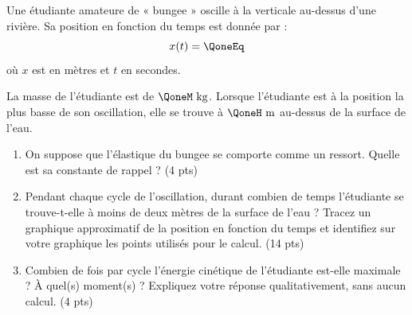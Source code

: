 
Une étudiante amateure de « bungee » oscille à la verticale au-dessus d'une rivière. Sa position en fonction du temps est donnée par :
\[ x(t) = \QoneEq \]
où $x$ est en mètres et $t$ en secondes.

La masse de l'étudiante est de $\QoneM\text{ kg}$. Lorsque l'étudiante est à la position la plus basse de son oscillation, elle se trouve à $\QoneH\text{ m}$ au-dessus de la surface de l'eau.

\begin{enumerate}[label=\alph*)]
    \item On suppose que l'élastique du bungee se comporte comme un ressort. Quelle est sa constante de rappel ? (4 pts)
    \item Pendant chaque cycle de l'oscillation, durant combien de temps l'étudiante se trouve-t-elle à moins de deux mètres de la surface de l'eau ? Tracez un graphique approximatif de la position en fonction du temps et identifiez sur votre graphique les points utilisés pour le calcul. (14 pts)
    \item Combien de fois par cycle l'énergie cinétique de l'étudiante est-elle maximale ? À quel(s) moment(s) ? Expliquez votre réponse qualitativement, sans aucun calcul. (4 pts)
\end{enumerate}